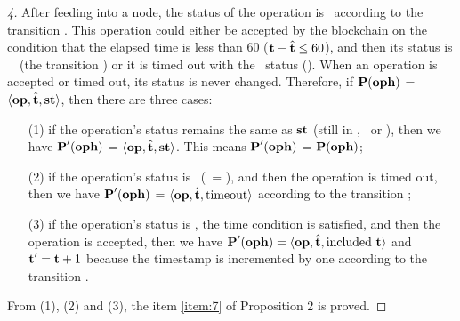 \documentclass[runningheads]{llncs}
\begin{document}
\begin{proof}[4]
 After feeding into a node, the status of the operation is \STATUSPENDING\ according to the transition . This operation could either be accepted by the blockchain on the condition that the elapsed time is less than 60 ($\textbf{t} - \hat{\textbf{t}} \le 60$), and then its status is \STATUSINCLUDED\ \TIME \ (the transition ) or it is timed out with the  \STATUSTIMEOUT\ status (). When an operation is accepted or timed out, its status is never changed. Therefore, if $\textbf{P} (\textbf{oph})$ = $\langle\textbf{op},  \hat{\textbf{t}}, \textbf{st}\rangle$, then there are  three cases:
 
 \begin{itemize}
 \item [(1)] if the operation's status remains the same as $\textbf{st}$ (still in \STATUSPENDING, \STATUSINCLUDED\ or \STATUSTIMEOUT), then we have $\textbf{P}' (\textbf{oph})$ = $\langle\textbf{op},  \hat{\textbf{t}}, \textbf{st}\rangle$. This means $\textbf{P}' (\textbf{oph})$ = $\textbf{P} (\textbf{oph})$; 
 \item [(2)] if the operation's status is \STATUSPENDING\ (\STATUS\ = \STATUSPENDING), and then the operation is timed out, then we have $\textbf{P}' (\textbf{oph})$ = $\langle\textbf{op}, \hat{\textbf{t}}, \text{timeout}\rangle$ according to the transition ; 
 \item [(3)] if the operation's status is \STATUSPENDING, the time condition is satisfied, and then the operation is accepted, then we have $\textbf{P}' (\textbf{oph}) = \langle\textbf{op}, \hat{\textbf{t}}, \text{included}\ \textbf{t} \rangle$ and $\textbf{t}'=\textbf{t} +1$ because the timestamp is incremented by one according to the transition .
 \end{itemize}
From (1), (2) and (3), the item \ref{item:7} of Proposition 2 is proved.
\end{proof}
\end{document}
